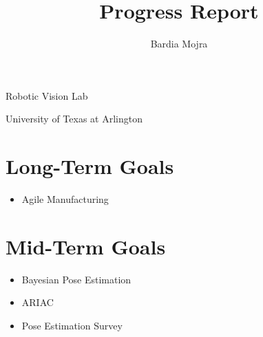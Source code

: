\documentclass[11pt]{article}
\title{Progress Report}
\author{Bardia Mojra}
\begin{document}
\maketitle
\thispagestyle{empty}


\bigskip
\bigskip
\begin{center}
Robotic Vision Lab
\end{center}

\begin{center}
University of Texas at Arlington
\end{center}



\newpage
\section{Long-Term Goals}
\begin{itemize}
    \item Agile Manufacturing 
\end{itemize}

\section{Mid-Term Goals}
\begin{itemize}
    \item Bayesian Pose Estimation 
    \item ARIAC
    \item Pose Estimation Survey 
\end{itemize}
\end{document}
